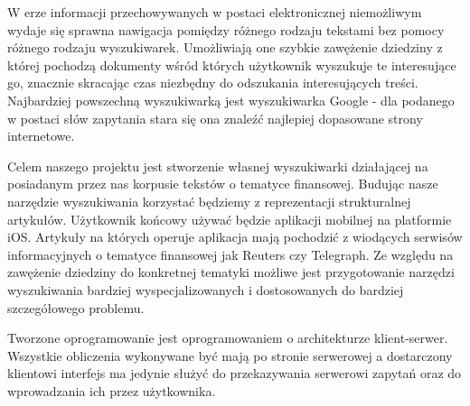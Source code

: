 W erze informacji przechowywanych w postaci elektronicznej niemożliwym wydaje się sprawna nawigacja pomiędzy różnego rodzaju tekstami bez pomocy różnego rodzaju wyszukiwarek. Umożliwiają one szybkie zawężenie dziedziny z której pochodzą dokumenty wśród których użytkownik wyszukuje te interesujące go, znacznie skracając czas niezbędny do odszukania interesujących treści.
Najbardziej powszechną wyszukiwarką jest wyszukiwarka Google - dla podanego w postaci słów zapytania stara się ona znaleźć najlepiej dopasowane strony internetowe.

Celem naszego projektu jest stworzenie własnej wyszukiwarki działającej na posiadanym przez nas korpusie tekstów o tematyce finansowej. Budując nasze narzędzie wyszukiwania korzystać będziemy z reprezentacji strukturalnej artykułów. Użytkownik końcowy używać będzie aplikacji mobilnej na platformie iOS. Artykuły na których operuje aplikacja mają pochodzić z wiodących serwisów informacyjnych o tematyce finansowej jak Reuters czy Telegraph. Ze względu na zawężenie dziedziny do konkretnej tematyki możliwe jest przygotowanie narzędzi wyszukiwania bardziej wyspecjalizowanych i dostosowanych do bardziej szczegółowego problemu. 

Tworzone oprogramowanie jest oprogramowaniem o architekturze klient-serwer. Wszystkie obliczenia wykonywane być mają po stronie serwerowej a dostarczony klientowi interfejs ma jedynie służyć do przekazywania serwerowi zapytań oraz do wprowadzania ich przez użytkownika.

